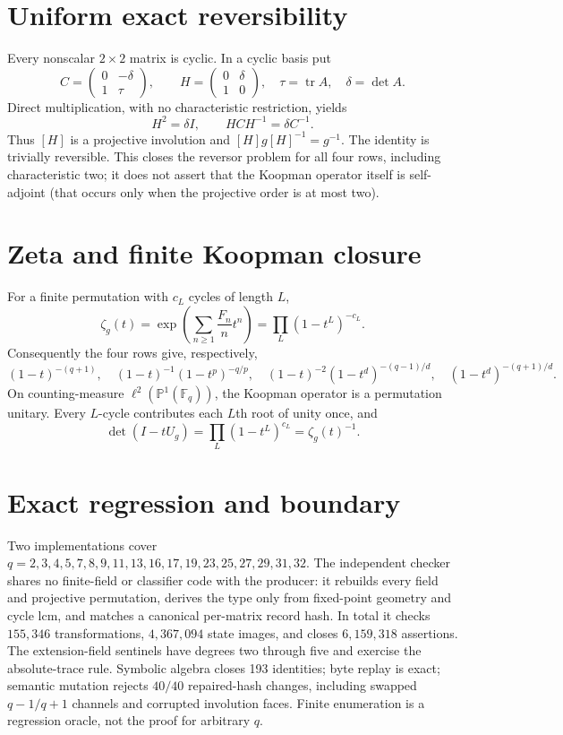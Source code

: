 \documentclass[10pt]{article}
\newcommand{\F}{\mathbb F}
\begin{document}
\section{Uniform exact reversibility}
Every nonscalar $2\times2$ matrix is cyclic.  In a cyclic basis put
\[
C=\begin{pmatrix}0&-\delta\\1&\tau\end{pmatrix},\qquad
H=\begin{pmatrix}0&\delta\\1&0\end{pmatrix},
\quad \tau=\operatorname{tr}A,\quad\delta=\det A.     \tag{4}
\]
Direct multiplication, with no characteristic restriction, yields
\[
 H^2=\delta I,\qquad HCH^{-1}=\delta C^{-1}.          \tag{5}
\]
Thus $[H]$ is a projective involution and
$[H]g[H]^{-1}=g^{-1}$.  The identity is trivially reversible.  This closes
the reversor problem for all four rows, including characteristic two; it does
not assert that the Koopman operator itself is self-adjoint (that occurs only
when the projective order is at most two).

\section{Zeta and finite Koopman closure}
For a finite permutation with $c_L$ cycles of length $L$,
\[
\zeta_g(t)=\exp\!\left(\sum_{n\ge1}\frac{F_n}{n}t^n\right)
=\prod_L(1-t^L)^{-c_L}.                              \tag{6}
\]
Consequently the four rows give, respectively,
\[
(1-t)^{-(q+1)},\quad
(1-t)^{-1}(1-t^p)^{-q/p},\quad
(1-t)^{-2}(1-t^d)^{-(q-1)/d},\quad
(1-t^d)^{-(q+1)/d}.                                  \tag{7}
\]
On counting-measure $\ell^2(\mathbb P^1(\F_q))$, the Koopman operator is a
permutation unitary.  Every $L$-cycle contributes each $L$th root of unity
once, and
\[
 \det(I-tU_g)=\prod_L(1-t^L)^{c_L}=\zeta_g(t)^{-1}.   \tag{8}
\]

\section{Exact regression and boundary}
Two implementations cover
$q=2,3,4,5,7,8,9,11,13,16,17,19,23,25,27,29,31,32$.
The independent checker shares no finite-field or classifier code with the
producer: it rebuilds every field and projective permutation, derives the
type only from fixed-point geometry and cycle lcm, and matches a canonical
per-matrix record hash.  In total it checks $155{,}346$ transformations,
$4{,}367{,}094$ state images, and closes $6{,}159{,}318$ assertions.  The
extension-field sentinels have degrees two through five and exercise the
absolute-trace rule.  Symbolic algebra closes 193 identities; byte replay is
exact; semantic mutation rejects $40/40$ repaired-hash changes, including
swapped $q-1/q+1$ channels and corrupted involution faces.  Finite enumeration
is a regression oracle, not the proof for arbitrary $q$.
\end{document}
